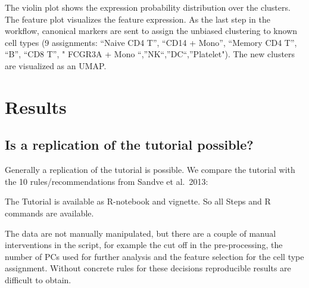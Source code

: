 \documentclass[a4paper, 10pt]{scrartcl}
\begin{document}
\hypertarget{visualization-of-the-marker-expressionresults}{%
\label{visualization-of-the-marker-expressionresults}}

The violin plot shows the expression probability distribution over the
clusters. The feature plot visualizes the feature expression. As the
last step in the workflow, canonical markers are sent to assign the
unbiased clustering to known cell types (9 assignments: ``Naive CD4 T'',
``CD14 + Mono'', ``Memory CD4 T'', ``B'', ``CD8 T'', " FCGR3A + Mono
``,''NK``,''DC``,''Platelet"). The new clusters are visualized as an
UMAP.

\hypertarget{results}{%
\section{Results}\label{results}}

\hypertarget{is-a-replication-of-the-tutorial-possible}{%
\subsection{Is a replication of the tutorial
possible?}\label{is-a-replication-of-the-tutorial-possible}}

Generally a replication of the tutorial is possible. We compare the
tutorial with the 10 rules/recommendations from Sandve et al.~2013:

\hypertarget{rule-1-for-every-result-keep-track-of-how-it-was-produced}{%
\label{rule-1-for-every-result-keep-track-of-how-it-was-produced}}

The Tutorial is available as R-notebook and vignette. So all Steps and R
commands are available.

\hypertarget{rule-2-avoid-manual-data-manipulation-steps}{%
\label{rule-2-avoid-manual-data-manipulation-steps}}

The data are not manually manipulated, but there are a couple of manual
interventions in the script, for example the cut off in the
pre-processing, the number of PCs used for further analysis and the
feature selection for the cell type assignment. Without concrete rules
for these decisions reproducible results are difficult to obtain.

\hypertarget{rule-3.-archive-the-exact-versions-of-all-external-programs-used}{%
\label{rule-3.-archive-the-exact-versions-of-all-external-programs-used}}
\end{document}
